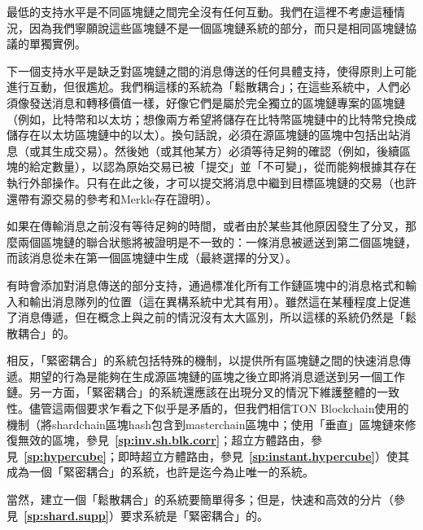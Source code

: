 \documentclass[12pt,oneside]{article}
\def\refpoint#1{{\rm\textbf{\ref{#1}}}}
\let\ptref=\refpoint
\begin{document}
最低的支持水平是不同區塊鏈之間完全沒有任何互動。我們在這裡不考慮這種情況，因為我們寧願說這些區塊鏈不是一個區塊鏈系統的部分，而只是相同區塊鏈協議的單獨實例。

下一個支持水平是缺乏對區塊鏈之間的消息傳送的任何具體支持，使得原則上可能進行互動，但很尷尬。我們稱這樣的系統為「鬆散耦合」；在這些系統中，人們必須像發送消息和轉移價值一樣，好像它們是屬於完全獨立的區塊鏈專案的區塊鏈（例如，比特幣和以太坊；想像兩方希望將儲存在比特幣區塊鏈中的比特幣兌換成儲存在以太坊區塊鏈中的以太）。換句話說，必須在源區塊鏈的區塊中包括出站消息（或其生成交易）。然後她（或其他某方）必須等待足夠的確認（例如，後續區塊的給定數量），以認為原始交易已被「提交」並「不可變」，從而能夠根據其存在執行外部操作。只有在此之後，才可以提交將消息中繼到目標區塊鏈的交易（也許還帶有源交易的參考和Merkle存在證明）。

如果在傳輸消息之前沒有等待足夠的時間，或者由於某些其他原因發生了分叉，那麼兩個區塊鏈的聯合狀態將被證明是不一致的：一條消息被遞送到第二個區塊鏈，而該消息從未在第一個區塊鏈中生成（最終選擇的分叉）。

有時會添加對消息傳送的部分支持，通過標准化所有工作鏈區塊中的消息格式和輸入和輸出消息隊列的位置（這在異構系統中尤其有用）。雖然這在某種程度上促進了消息傳遞，但在概念上與之前的情況沒有太大區別，所以這樣的系統仍然是「鬆散耦合」的。

相反，「緊密耦合」的系統包括特殊的機制，以提供所有區塊鏈之間的快速消息傳遞。期望的行為是能夠在生成源區塊鏈的區塊之後立即將消息遞送到另一個工作鏈。另一方面，「緊密耦合」的系統還應該在出現分叉的情況下維護整體的一致性。儘管這兩個要求乍看之下似乎是矛盾的，但我們相信TON Blockchain使用的機制（將shardchain區塊hash包含到masterchain區塊中；使用「垂直」區塊鏈來修復無效的區塊，參見~\ptref{sp:inv.sh.blk.corr}；超立方體路由，參見~\ptref{sp:hypercube}；即時超立方體路由，參見~\ptref{sp:instant.hypercube}）使其成為一個「緊密耦合」的系統，也許是迄今為止唯一的系統。

當然，建立一個「鬆散耦合」的系統要簡單得多；但是，快速和高效的分片（參見~\ptref{sp:shard.supp}）要求系統是「緊密耦合」的。
\end{document}
